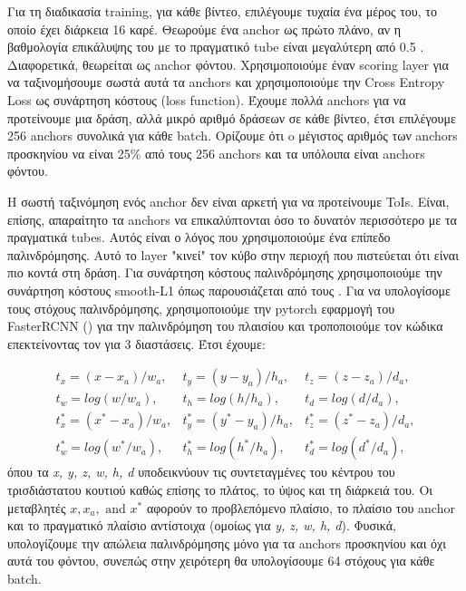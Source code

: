 \documentclass{report}
\begin{document}
Για τη διαδικασία training, για κάθε βίντεο, επιλέγουμε τυχαία ένα μέρος του, το οποίο έχει διάρκεια 16 καρέ. Θεωρούμε ένα anchor ως πρώτο πλάνο, αν η βαθμολογία επικάλυψης του με το πραγματικό
tube είναι μεγαλύτερη από 0.5 . Διαφορετικά, θεωρείται ως anchor φόντου. Χρησιμοποιούμε έναν scoring layer για να ταξινομήσουμε σωστά αυτά τα anchors και χρησιμοποιούμε
την Cross Entropy Loss ως συνάρτηση κόστους (loss function). Έχουμε πολλά anchors για να προτείνουμε μια δράση, αλλά μικρό αριθμό δράσεων σε κάθε βίντεο, έτσι επιλέγουμε 256 anchors συνολικά για
κάθε batch. Ορίζουμε ότι o μέγιστος αριθμός των anchors προσκηνίου να είναι 25\% από τους 256 anchors και τα υπόλοιπα είναι anchors φόντου.  \par
Η σωστή ταξινόμηση ενός anchor δεν είναι αρκετή για να προτείνουμε ToIs. Είναι, επίσης,  απαραίτητο τα anchors να επικαλύπτονται όσο το δυνατόν περισσότερο με τα πραγματικά tubes.
Αυτός είναι ο λόγος που χρησιμοποιούμε ένα επίπεδο παλινδρόμησης. Αυτό το layer "κινεί" τον κύβο στην περιοχή που πιστεύεται ότι είναι πιο κοντά στη δράση.
Για συνάρτηση κόστους παλινδρόμησης χρησιμοποιούμε την συνάρτηση κόστους smooth-L1  όπως παρουσιάζεται από τους \cite{DBLP:journals/corr/GirshickDDM13}. Για να υπολογίσομε τους
 στόχους παλινδρόμησης, χρησιμοποιούμε την pytorch εφαρμογή του  FasterRCNN (\cite{jjfaster2rcnn}) για την παλινδρόμηση του πλαισίου και 
τροποποιούμε τον κώδικα επεκτείνοντας τον για 3 διαστάσεις. %
Έτσι έχουμε:

\[ \begin{matrix}
    t_x = (x-x_a)/w_a, & t_y = (y-y_a)/h_a, & t_z= (z-z_a)/d_a, \\
    t_w= log(w/w_a), & t_h= log(h/h_a), & t_d = log(d/d_a), \\
    t^*_x = (x^* - x_a)/w_a, & t^*_y = (y^* - y_a)/h_a, & t^*_z = (z^* - z_a)/d_a, \\
    t^*_w = log(w^* /w_a), & t^*_h = log(h^*/h_a), & t^*_d = log(d^*/d_a),
  \end{matrix}
\]
όπου τα \textit{x, y, z, w, h, d} υποδεικνύουν τις συντεταγμένες του κέντρου του τρισδιάστατου κουτιού καθώς επίσης το πλάτος, το ύψος και τη διάρκειά του. Οι μεταβλητές
$x, x_a, \text{ and } x^*$ αφορούν το προβλεπόμενο πλαίσιο, το πλαίσιο του anchor και το πραγματικό πλαίσιο αντίστοιχα (ομοίως για \textit{y, z, w, h, d}). Φυσικά, υπολογίζουμε την
απώλεια παλινδρόμησης μόνο για τα anchors προσκηνίου και όχι αυτά του φόντου, συνεπώς στην χειρότερη θα υπολογίσουμε 64 στόχους για κάθε batch. \par
\end{document}
